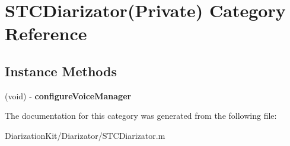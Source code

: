 \hypertarget{category_s_t_c_diarizator_07_private_08}{}\section{S\+T\+C\+Diarizator(Private) Category Reference}
\label{category_s_t_c_diarizator_07_private_08}
\subsection*{Instance Methods}
\begin{DoxyCompactItemize}
\item 
\hypertarget{category_s_t_c_diarizator_07_private_08_a8e2580b89f19b4f15e9e473331165cc5}{}\label{category_s_t_c_diarizator_07_private_08_a8e2580b89f19b4f15e9e473331165cc5} 
(void) -\/ {\bfseries configure\+Voice\+Manager}
\end{DoxyCompactItemize}


The documentation for this category was generated from the following file\+:\begin{DoxyCompactItemize}
\item 
Diarization\+Kit/\+Diarizator/S\+T\+C\+Diarizator.\+m\end{DoxyCompactItemize}
